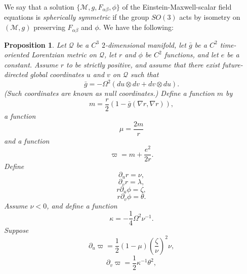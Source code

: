 \documentclass{article}
\newtheorem{proposition}[theorem]{Proposition}
\newcommand{\zn}{\frac{\zeta}{\nu}}
\begin{document}
We say that a solution $\{\mathcal{M},g,F_{\alpha\beta},\phi\}$ of
the Einstein-Maxwell-scalar field equations is \emph{spherically symmetric}
if the group $SO(3)$ acts by isometry on $(\mathcal{M},g)$ preserving
$F_{\alpha\beta}$ and $\phi$.
We have the following:

\begin{proposition}
\label{megalnprotasn}
Let $\mathcal{Q}$ be a $C^3$ $2$-dimensional manifold, let
$\bar{g}$ be a $C^2$ time-oriented Lorentzian metric on $\mathcal{Q}$,
let $r$ and $\phi$ be $C^2$ functions, and let $e$ be a constant.
Assume $r$ to be strictly positive, and assume that there exist
future-directed global coordinates
$u$ and $v$ on
$\mathcal{Q}$ such that
\begin{equation}
\label{W-orism}
\bar{g}=-\Omega^2(du\otimes dv+dv\otimes du).
\end{equation}
(Such coordinates are known as null coordinates.)
Define a function $m$ by
\begin{equation}
\label{m-orism}
m=\frac{r}2(1-\bar{g}(\nabla r,\nabla r)),
\end{equation}
a function 
\begin{equation}
\label{mu-orism}
\mu=\frac{2m}r
\end{equation}
and
a function
\begin{equation}
\label{pi-orism}
\varpi=m+\frac{e^2}{2r}.
\end{equation}
Define 
\begin{equation}
\label{ruqu}
\partial_ur=\nu, 
\end{equation}
\begin{equation}
\label{rvqu}
\partial_vr=\lambda,
\end{equation}
\begin{equation}
\label{z-orism}
r\partial_u\phi=\zeta,
\end{equation}
\begin{equation}
\label{th-orism}
r\partial_v\phi=\theta.
\end{equation}
Assume $\nu<0$, and define a function
\begin{equation}
\label{kappaoris}
\kappa=-\frac14\Omega^{2}{\nu}^{-1}.
\end{equation}
Suppose 
\begin{equation}
\label{puqu}
\partial_u\varpi=\frac{1}{2}(1-\mu)\left(\zn\right)^2\nu,
\end{equation}
\begin{equation}
\label{pvqu}
\partial_v\varpi=\frac{1}{2}\kappa^{-1}\theta^2,
\end{equation}

\end{proposition}
\end{document}
